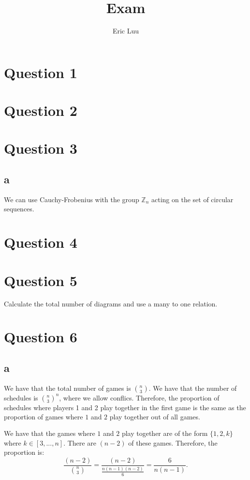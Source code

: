 \documentclass[]{article}
\title{Exam}
\author{Eric Luu}
\theoremstyle{definition}
\numberwithin{theorem}{section}
\numberwithin{equation}{section}
\begin{document}
\maketitle
\section{Question 1}



\section{Question 2}

\section{Question 3}
\subsection{a}
We can use Cauchy-Frobenius with the group $\mathbb{Z}_n$ acting on the set of circular sequences.

\section{Question 4}

\section{Question 5}
Calculate the total number of diagrams and use a many to one relation.

\section{Question 6}

\subsection{a}
We have that the total number of games is $\binom{n}{3}$. We have that the number of schedules is $\binom{n}{3}^n$, where we allow conflics. Therefore, the proportion of schedules where players 1 and 2 play together in the first game is the same as the proportion of games where $1$ and $2$ play together out of all games. 

We have that the games where $1$ and $2$ play together are of the form $\{ 1, 2, k\}$ where $k \in [3, ..., n]$. There are $(n-2)$ of these games.
Therefore, the proportion is:
\begin{equation}
	\frac{(n-2)}{\binom{n}{3}} = \frac{(n-2)}{\frac{n(n-1)(n-2)}{6}} = \frac{6}{n(n-1)}.
\end{equation}
\end{document}

